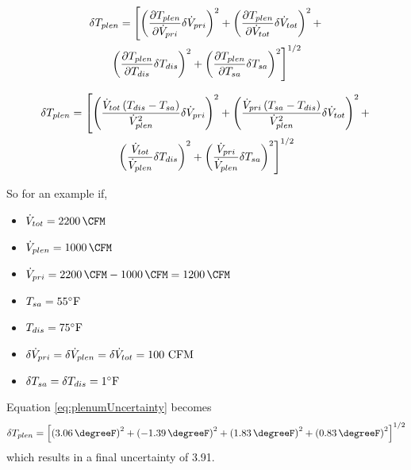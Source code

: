 \begin{multline}
    \delta T_{plen} = \left[\left( \pdv{T_{plen}}{\dot{V}_{pri}} \delta \dot{V}_{pri}   \right)^2  +\left( \pdv{T_{plen}}{\dot{V}_{tot}} \delta \dot{V}_{tot}   \right)^2 + \right. \\
    \left. \left( \pdv{T_{plen}}{T_{dis}} \delta T_{dis}   \right)^2 + \left( \pdv{T_{plen}}{T_{sa}} \delta T_{sa}   \right)^2  \right]^{1/2}
\end{multline}

\begin{multline}\label{eq:plenumUncertainty}
    \delta T_{plen} = \left[\left(  \frac{\dot{V}_{tot}\left(T_{dis}-T_{sa} \right)}{{\dot{V}_{plen}}^2}   \delta \dot{V}_{pri} \right)^2  +\left(\frac{\dot{V}_{pri}\left(T_{sa}-T_{dis} \right)}{{\dot{V}_{plen}}^2}      \delta \dot{V}_{tot}   \right)^2 + \right. \\
    \left. \left( \frac{\dot{V}_{tot}}{\dot{V}_{plen}} \delta T_{dis}   \right)^2 + \left(\frac{\dot{V}_{pri}}{\dot{V}_{plen}}  \delta T_{sa}   \right)^2  \right]^{1/2}
\end{multline}

So for an example if, 

\newcommand{\flowtotvalue}{\SI{2200}{\CFM}}
\newcommand{\plenflowvalue}{\SI{1000}{\CFM}}

\begin{itemize}
    \item \(\totflow{}=\flowtotvalue\)
    \item \(\plenflow{}=\plenflowvalue\)
    \item \(\priflow=\flowtotvalue - \plenflowvalue = \SI{1200}{\CFM} \)
    \item \(T_{sa} = 55^{\circ}\text{F} \)
    \item \(T_{dis} = 75^{\circ}\text{F} \)
    \item \(\delta\dot{V}_{pri}{}=\delta\dot{V}_{plen}=\delta\dot{V}_{tot}=100 \text{ CFM}\)
    \item \(\delta T_{sa} = \delta T_{dis} = 1^{\circ} \text{F} \)
\end{itemize}

Equation \ref{eq:plenumUncertainty} becomes
\begin{equation}\label{eq:plenumUncertainty2}
    \delta T_{plen} = \left[\left(  \SI{3.06}{\degreeF}  \right)^2  +\left( \SI{-1.39}{\degreeF}  \right)^2 +  \left( \SI{1.83}{\degreeF} \right)^2 + \left(\SI{0.83}{\degreeF}  \right)^2  \right]^{1/2}
\end{equation}
which results in a final uncertainty of \SI{3.91}{\degreeF}.

